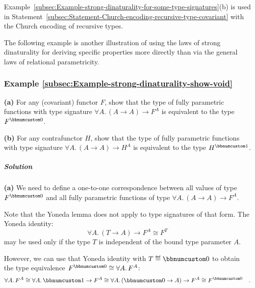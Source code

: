 Example~\ref{subsec:Example-strong-dinaturality-for-some-type-signatures}(b)
is used in Statement~\ref{subsec:Statement-Church-encoding-recursive-type-covariant}
with the Church encoding of recursive types.

The following example is another illustration of using the laws of
strong dinaturality for deriving specific properties more directly
than via the general laws of relational parametricity.

\subsubsection{Example \label{subsec:Example-strong-dinaturality-show-void}\ref{subsec:Example-strong-dinaturality-show-void}}

\textbf{(a)} For any (covariant) functor $F$, show that the type
of fully parametric functions with type signature $\forall A.\,\left(A\rightarrow A\right)\rightarrow F^{A}$
is equivalent to the type $F^{\bbnum 0}$.

\textbf{(b)} For any contrafunctor $H$, show that the type of fully
parametric functions with type signature $\forall A.\,\left(A\rightarrow A\right)\rightarrow H^{A}$
is equivalent to the type $H^{\bbnum 1}$.

\subparagraph{Solution}

\textbf{(a)} We need to define a one-to-one correspondence between
all values of type $F^{\bbnum 0}$ and all fully parametric functions
of type $\forall A.\,\left(A\rightarrow A\right)\rightarrow F^{A}$.

Note that the Yoneda lemma does not apply to type signatures of that
form. The Yoneda identity:
\[
\forall A.\,\left(T\rightarrow A\right)\rightarrow F^{A}\cong F^{T}
\]
may be used only if the type $T$ is independent of the bound type
parameter $A$.

However, we can use that Yoneda identity with $T\triangleq\bbnum 0$
to obtain the type equivalence $F^{\bbnum 0}\cong\forall A.\,F^{A}$:
\[
\forall A.\,F^{A}\cong\forall A.\,\bbnum 1\rightarrow F^{A}\cong\forall A.\,(\bbnum 0\rightarrow A)\rightarrow F^{A}\cong F^{\bbnum 0}\quad.
\]

